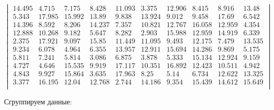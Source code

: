 \documentclass[a4paper, 14pt]{extarticle}
\begin{document}
\begin{equation*}
    \begin{vmatrix}
        14.495 & 4.715 & 7.175 & 8.428 & 11.093 & 3.375 & 12.906 & 8.415 & 8.916 & 13.48 \\
        5.343 & 17.985 & 15.992 & 13.89 & 9.838 & 13.924 & 9.012 & 9.458 & 17.69 & 6.542 \\
        14.396 & 8.592 & 8.206 & 14.237 & 7.357 & 10.821 & 12.767 & 16.058 & 12.959 & 4.354 \\
        12.888 & 10.268 & 9.182 & 5.647 & 8.282 & 2.903 & 15.988 & 12.959 & 14.919 & 6.339 \\
        2.375 & 17.921 & 9.097 & 15.85 & 11.449 & 11.095 & 9.493 & 12.175 & 7.479 & 13.535 \\
        9.234 & 6.078 & 4.964 & 6.355 & 13.957 & 12.911 & 15.694 & 14.286 & 9.869 & 5.175 \\
        5.811 & 7.241 & 5.814 & 3.086 & 6.875 & 3.878 & 5.333 & 15.134 & 12.924 & 9.159 \\
        4.727 & 4.646 & 15.535 & 9.919 & 17.117 & 10.351 & 16.892 & 12.423 & 10.511 & 4.942 \\
        4.843 & 9.927 & 15.864 & 3.635 & 17.963 & 8.25 & 5.14 & 6.734 & 12.622 & 13.325 \\
        3.377 & 16.195 & 12.04 & 12.768 & 2.744 & 14.186 & 9.354 & 15.439 & 14.612 & 15.649 \\
    \end{vmatrix}
\end{equation*}

Сгруппируем данные:
\end{document}
